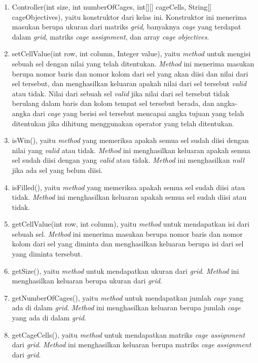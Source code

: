 \begin{enumerate}
\item Controller(int size, int numberOfCages, int[][] cageCells, String[] cageObjectives), yaitu konstruktor dari kelas ini. Konstruktor ini menerima masukan berupa ukuran dari matriks \textit{grid}, banyaknya \textit{cage} yang terdapat dalam \textit{grid}, matriks \textit{cage assignment}, dan array \textit{cage objectives}.
\item setCellValue(int row, int column, Integer value), yaitu \textit{method} untuk mengisi sebuah sel dengan nilai yang telah ditentukan. \textit{Method} ini menerima masukan berupa nomor baris dan nomor kolom dari sel yang akan diisi dan nilai dari sel tersebut, dan menghasilkan keluaran apakah nilai dari sel tersebut \textit{valid} atau tidak. Nilai dari sebuah sel \textit{valid} jika nilai dari sel tersebut tidak berulang dalam baris dan kolom tempat sel tersebut berada, dan angka-angka dari \textit{cage} yang berisi sel tersebut mencapai angka tujuan yang telah ditentukan jika dihitung menggunakan operator yang telah ditentukan.
\item isWin(), yaitu \textit{method} yang memeriksa apakah semua sel sudah diisi dengan nilai yang \textit{valid} atau tidak. \textit{Method} ini menghasilkan keluaran apakah semua sel sudah diisi dengan yang \textit{valid} atau tidak. \textit{Method} ini menghasilkan \textit{null} jika ada sel yang belum diisi.
\item isFilled(), yaitu \textit{method} yang memeriksa apakah semua sel sudah diisi atau tidak. \textit{Method} ini menghasilkan keluaran apakah semua sel sudah diisi atau tidak.
\item getCellValue(int row, int column), yaitu \textit{method} untuk mendapatkan isi dari sebuah sel. \textit{Method} ini menerima masukan berupa nomor baris dan nomor kolom dari sel yang diminta dan menghasilkan keluaran berupa isi dari sel yang diminta tersebut.
\item getSize(), yaitu \textit{method} untuk mendapatkan ukuran dari \textit{grid}. \textit{Method} ini menghasilkan keluaran berupa ukuran dari \textit{grid}.
\item getNumberOfCages(), yaitu \textit{method} untuk mendapatkan jumlah \textit{cage} yang ada di dalam \textit{grid}. \textit{Method} ini menghasilkan keluaran berupa jumlah \textit{cage} yang ada di dalam \textit{grid}.
\item getCageCells(), yaitu \textit{method} untuk mendapatkan matriks \textit{cage assignment} dari \textit{grid}. \textit{Method} ini menghasilkan keluaran berupa matriks \textit{cage assignment} dari \textit{grid}.

\end{enumerate}
